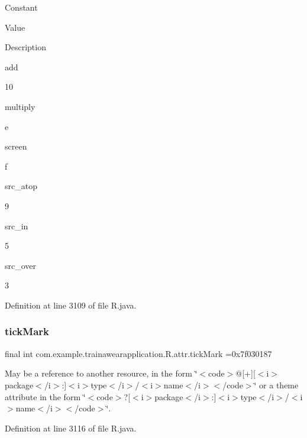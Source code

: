 Constant

Value

Description 

add

10

multiply

e

screen

f

src\+\_\+atop

9

src\+\_\+in

5

src\+\_\+over

3

Definition at line 3109 of file R.\+java.

\mbox{\label{classcom_1_1example_1_1trainawearapplication_1_1_r_1_1attr_a24c7c233c39f72ce303b082f35d66c89}} 
\subsubsection{\texorpdfstring{tickMark}{tickMark}}
{\footnotesize\ttfamily final int com.\+example.\+trainawearapplication.\+R.\+attr.\+tick\+Mark =0x7f030187\hspace{0.3cm}{\ttfamily [static]}}

May be a reference to another resource, in the form \char`\"{}$<$code$>$@\mbox{[}+\mbox{]}\mbox{[}$<$i$>$package$<$/i$>$\+:\mbox{]}$<$i$>$type$<$/i$>$/$<$i$>$name$<$/i$>$$<$/code$>$\char`\"{} or a theme attribute in the form \char`\"{}$<$code$>$?\mbox{[}$<$i$>$package$<$/i$>$\+:\mbox{]}$<$i$>$type$<$/i$>$/$<$i$>$name$<$/i$>$$<$/code$>$\char`\"{}. 

Definition at line 3116 of file R.\+java.

\mbox{\label{classcom_1_1example_1_1trainawearapplication_1_1_r_1_1attr_a91a05f3697af6e693ff8680b084b4ada}} 
